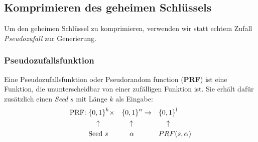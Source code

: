 \documentclass[12pt,A4]{extarticle}
\begin{document}
\subsection{Komprimieren des geheimen Schlüssels}
Um den geheimen Schlüssel zu komprimieren, verwenden wir statt echtem Zufall \textit{Pseudozufall} zur Generierung.
\subsubsection{Pseudozufallsfunktion}\label{sec:prf}
Eine Pseudozufallsfunktion oder Pseudorandom function (\textbf{PRF}) ist eine Funktion, die ununterscheidbar von einer zufälligen Funktion ist. Sie erhält dafür zusätzlich einen \textit{Seed} $s$ mit Länge $k$ als Eingabe:
\begin{alignat*}{5}
  \text{PRF: } & {\{0,1\}}^k \times      &  & {\{0,1\}}^n \rightarrow &  & {\{0,1\}}^l             \\
               & \hspace{0.3cm} \uparrow &  & \hspace{0.3cm}\uparrow  &  & \hspace{0.3cm} \uparrow \\
               & \text{Seed } s          &  & \hspace{0.4cm}\alpha    &  & PRF(s, \alpha)
\end{alignat*}
\end{document}

